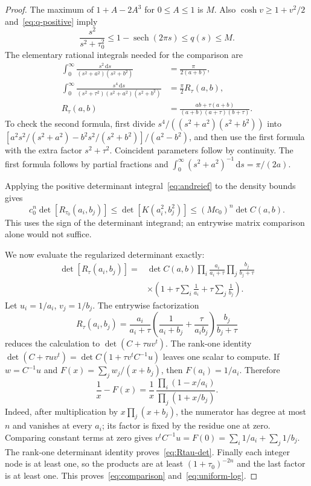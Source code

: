 \documentclass[11pt]{article}
\theoremstyle{definition}
\theoremstyle{remark}
\numberwithin{equation}{section}
\newcommand{\dd}{\,\mathrm d}
\DeclareMathOperator{\sech}{sech}
\begin{document}
\begin{proof}
The maximum of $1+A-2A^3$ for $0\leq A\leq1$ is $M$. Also
$\cosh v\geq1+v^2/2$ and~\eqref{eq:q-positive} imply
\begin{equation}\label{eq:density-comparison}
 \frac{s^2}{s^2+\tau_0^2}\leq1-\sech(2\pi s)\leq q(s)\leq M.
\end{equation}
The elementary rational integrals needed for the comparison are
\begin{align}
 \int_0^\infty\frac{s^2\dd s}{(s^2+a^2)(s^2+b^2)}
   &=\frac\pi{2(a+b)},\label{eq:rational-integral1}\\
 \int_0^\infty\frac{s^4\dd s}
 {(s^2+\tau^2)(s^2+a^2)(s^2+b^2)}
   &=\frac\pi2 R_\tau(a,b),\label{eq:rational-integral2}\\
 R_\tau(a,b)&=\frac{ab+\tau(a+b)}{(a+b)(a+\tau)(b+\tau)}.
 \label{eq:Rtau}
\end{align}
To check the second formula, first divide
$s^4/((s^2+a^2)(s^2+b^2))$ into
$[a^2s^2/(s^2+a^2)-b^2s^2/(s^2+b^2)]/(a^2-b^2)$,
and then use the first formula with the extra factor $s^2+\tau^2$.
Coincident parameters follow by continuity. The first formula follows
by partial fractions and $\int_0^\infty(s^2+a^2)^{-1}\dd s=\pi/(2a)$.

Applying the positive determinant integral~\eqref{eq:andreief} to the
density bounds gives
\begin{equation}\label{eq:regularized-bounds}
 c_0^n\det[R_{\tau_0}(a_i,b_j)]
 \leq\det[K(a_i^2,b_j^2)]\leq(Mc_0)^n\det C(a,b).
\end{equation}
This uses the sign of the determinant integrand; an entrywise matrix
comparison alone would not suffice.

We now evaluate the regularized determinant exactly:
\begin{equation}\label{eq:Rtau-det}
 \begin{split}
 \det[R_\tau(a_i,b_j)]={}&\det C(a,b)
 \prod_i\frac{a_i}{a_i+\tau}\prod_j\frac{b_j}{b_j+\tau}\\
 &\times\left(1+\tau\sum_i\frac1{a_i}+\tau\sum_j\frac1{b_j}\right).
 \end{split}
\end{equation}
Let $u_i=1/a_i$, $v_j=1/b_j$. The entrywise factorization
\[
 R_\tau(a_i,b_j)=\frac{a_i}{a_i+\tau}
  \left(\frac1{a_i+b_j}+\frac{\tau}{a_i b_j}\right)
  \frac{b_j}{b_j+\tau}
\]
reduces the calculation to $\det(C+\tau uv^t)$.
The rank-one identity
$\det(C+\tau uv^t)=\det C(1+\tau v^tC^{-1}u)$ leaves one scalar
to compute. If $w=C^{-1}u$ and
$F(x)=\sum_jw_j/(x+b_j)$, then $F(a_i)=1/a_i$. Therefore
\[
 \frac1x-F(x)=\frac1x\,
 \frac{\prod_i(1-x/a_i)}{\prod_j(1+x/b_j)}.
\]
Indeed, after multiplication by $x\prod_j(x+b_j)$, the numerator has
degree at most $n$ and vanishes at every $a_i$; its factor is fixed by
the residue one at zero. Comparing constant terms at zero gives
$v^tC^{-1}u=F(0)=\sum_i1/a_i+\sum_j1/b_j$.
The rank-one determinant identity proves~\eqref{eq:Rtau-det}.
Finally each integer node is at least one, so the products are at least
$(1+\tau_0)^{-2n}$ and the last factor is at least one.
This proves~\eqref{eq:comparison} and~\eqref{eq:uniform-log}.
\end{proof}
\end{document}
